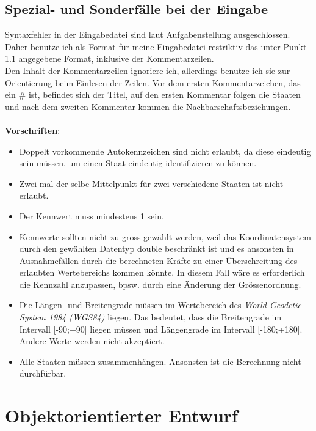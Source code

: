 \documentclass[a4paper,11pt]{article}
\begin{document}
{\subsection{Spezial- und Sonderf\"alle bei der Eingabe}
Syntaxfehler in der Eingabedatei sind laut Aufgabenstellung ausgeschlossen. Daher benutze ich als Format f\"ur meine Eingabedatei restriktiv das unter Punkt 1.1 angegebene Format,
inklusive der Kommentarzeilen.\\ Den Inhalt der Kommentarzeilen ignoriere ich, allerdings benutze ich sie zur Orientierung beim Einlesen der Zeilen. Vor dem ersten Kommentarzeichen, das ein \# ist, befindet sich
der Titel, auf den ersten Kommentar folgen die Staaten und nach dem zweiten Kommentar kommen die Nachbarschaftsbeziehungen.\\ \\ \textbf{Vorschriften}:\\
\vspace{3mm}
\begin{itemize}
\item Doppelt vorkommende Autokennzeichen sind nicht erlaubt, da diese eindeutig sein m\"ussen, um einen Staat eindeutig identifizieren zu k\"onnen.\\
\item Zwei mal der selbe Mittelpunkt f\"ur zwei verschiedene Staaten ist nicht erlaubt. \\
\item Der Kennwert muss mindestens 1 sein.
\item Kennwerte sollten nicht zu gross gew\"ahlt werden, weil das Koordinatensystem durch den gew\"ahlten Datentyp
double beschr\"ankt ist und es ansonsten in Ausnahmef\"allen durch die berechneten Kr\"afte zu einer \"Uberschreitung des erlaubten Wertebereichs kommen k\"onnte. In diesem Fall w\"are es erforderlich die Kennzahl anzupassen, bpsw. durch eine \"Anderung der Gr\"ossenordnung.
\item Die L\"angen- und Breitengrade m\"ussen im Wertebereich des \textit{World Geodetic System 1984 (WGS84)} liegen. Das bedeutet, dass die Breitengrade im Intervall [-90;+90] liegen m\"ussen und L\"angengrade im Intervall [-180;+180].
Andere Werte werden nicht akzeptiert.
\item Alle Staaten m\"ussen zusammenh\"angen. Ansonsten ist die Berechnung nicht durchf\"urbar.
\end{itemize}
\section{Objektorientierter Entwurf}


}
\end{document}
